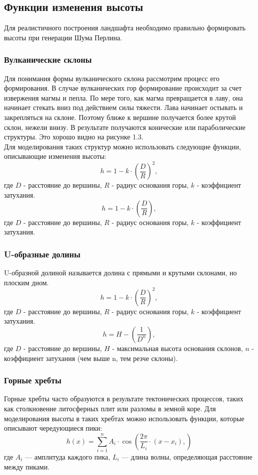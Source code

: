 

\subsection{Функции изменения высоты}
Для реалистичного построения ландшафта необходимо правильно формировать высоты 
при генерации Шума Перлина. 
\subsubsection{Вулканические склоны}
Для понимания формы вулканического склона рассмотрим процесс его формирования. 
В случае вулканических гор формирование происходит за счет извержения магмы и пепла. По мере того, как магма превращается в лаву, она начинает стекать вниз под действием силы тяжести. Лава начинает остывать и закрепляться на склоне. Поэтому ближе к вершине получается более крутой склон, нежели  внизу. В результате получаются конические или параболические структуры. Это хорошо видно на рисунке 1.3. \\
Для моделирования таких структур можно использовать следующие функции, описывающие изменения высоты:
\[
h = 1 - k\cdot(\frac{D}{R})^2,
\] где $D$ - расстояние до вершины, $R$ - радиус основания горы, $k$ - коэффициент затухания.
\\
\[
h = 1 - k\cdot(\frac{D}{R}),
\] где $D$ - расстояние до вершины, $R$ - радиус основания горы, $k$ - коэффициент затухания.

\subsubsection{U-образные долины}
U-образной долиной называется долина с прямыми и крутыми склонами, но плоским дном. 
\[
h = 1 - k\cdot(\frac{D}{R})^2,
\] где $D$ - расстояние до вершины, $R$ - радиус основания горы, $k$ - коэффициент затухания.
\\
\[
h = H - (\frac{1}{D^n}),
\] где $D$ - расстояние до вершины, $H$ - максимальная высота основания склонов, $n$ - коэффициент затухания (чем выше n, тем резче склоны).

\subsubsection{Горные хребты}
Горные хребты часто образуются в результате тектонических процессов, таких как столкновение литосферных плит или разломы в земной коре. 
Для моделирования высоты в таких хребтах можно использовать функции, которые описывают чередующиеся пики:
\[
h(x) = \sum_{i=1}^{n} A_i \cdot \cos\left( \frac{2\pi}{L_i} \cdot (x - x_i), \right)
\]
где $A_i$ — амплитуда каждого пика, $L_i$ — длина волны, определяющая расстояние между пиками.

